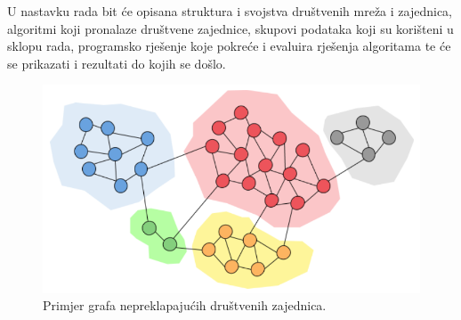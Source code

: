 U nastavku rada bit će opisana struktura i svojstva društvenih mreža i zajednica, algoritmi koji pronalaze društvene zajednice, skupovi podataka koji su korišteni u sklopu rada, programsko rješenje koje pokreće i evaluira rješenja algoritama te će se prikazati i rezultati  do kojih se došlo. 


\begin{figure}
	\includegraphics[width=\linewidth]{images/simple-community.png}
	\caption{Primjer grafa nepreklapajućih društvenih zajednica.}
	\label{fig:comm1}
\end{figure}
